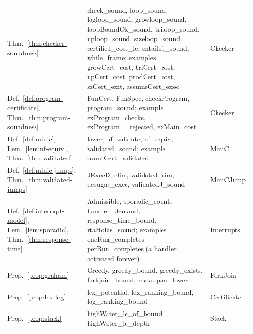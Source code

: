 \documentclass[oneside,english]{amsart}
\numberwithin{equation}{section}
\numberwithin{figure}{section}
\theoremstyle{plain}
\theoremstyle{definition}
\theoremstyle{plain}
\theoremstyle{remark}
\theoremstyle{plain}
\theoremstyle{definition}
\theoremstyle{plain}
\theoremstyle{remark}
\newcommand{\lean}[1]{{\ttfamily\small #1}}
\begin{document}
\begin{table}[p]
\begin{tabular}{@{}>{\raggedright\arraybackslash}p{}>{\raggedright\arraybackslash}p{}>{\raggedright\arraybackslash}p{}@{}}
Thm.~\ref{thm:checker-soundness} & \lean{check\_\allowbreak sound}, \lean{loop\_\allowbreak sound}, \lean{logloop\_\allowbreak sound}, \lean{growloop\_\allowbreak sound}, \lean{loopBoundOk\_\allowbreak sound}, \lean{triloop\_\allowbreak sound}, \lean{uploop\_\allowbreak sound}, \lean{sizeloop\_\allowbreak sound}, \lean{certified\_\allowbreak cost\_\allowbreak le}, \lean{entails1\_\allowbreak sound}, \lean{while\_\allowbreak frame}; examples \lean{growCert\_\allowbreak cost}, \lean{triCert\_\allowbreak cost}, \lean{upCert\_\allowbreak cost}, \lean{prodCert\_\allowbreak cost}, \lean{szCert\_\allowbreak exit}, \lean{assumeCert\_\allowbreak exec} & \lean{Checker} \\
Def.~\ref{def:program-certificate}, Thm.~\ref{thm:program-soundness} & \lean{FunCert}, \lean{FunSpec}, \lean{checkProgram}, \lean{program\_\allowbreak sound}; example \lean{exProgram\_\allowbreak checks}, \lean{exProgram\_\allowbreak 17\_\allowbreak rejected}, \lean{exMain\_\allowbreak cost} & \lean{Checker} \\
Def.~\ref{def:minic}, Lem.~\ref{lem:nf-equiv}, Thm.~\ref{thm:validated} & \lean{lower}, \lean{nf}, \lean{validate}, \lean{nf\_\allowbreak equiv}, \lean{validated\_\allowbreak sound}; example \lean{countCert\_\allowbreak validated} & \lean{MiniC} \\
Def.~\ref{def:minic-jumps}, Thm.~\ref{thm:validated-jumps} & \lean{JExecD}, \lean{elim}, \lean{validateJ}, \lean{sim}, \lean{desugar\_\allowbreak exec}, \lean{validatedJ\_\allowbreak sound} & \lean{MiniCJump} \\
Def.~\ref{def:interrupt-model}, Lem.~\ref{lem:sporadic}, Thm.~\ref{thm:response-time} & \lean{Admissible}, \lean{sporadic\_\allowbreak count}, \lean{handler\_\allowbreak demand}, \lean{response\_\allowbreak time\_\allowbreak bound}, \lean{rtaHolds\_\allowbreak sound}; examples \lean{oneRun\_\allowbreak completes}, \lean{perRun\_\allowbreak completes} (a handler activated forever) & \lean{Interrupts} \\
Prop.~\ref{prop:graham} & \lean{Greedy}, \lean{greedy\_\allowbreak bound}, \lean{greedy\_\allowbreak exists}, \lean{forkjoin\_\allowbreak bound}, \lean{makespan\_\allowbreak lower} & \lean{ForkJoin} \\
Prop.~\ref{prop:lex-log} & \lean{lex\_\allowbreak potential}, \lean{lex\_\allowbreak ranking\_\allowbreak bound}, \lean{log\_\allowbreak ranking\_\allowbreak bound} & \lean{Certificate} \\
Prop.~\ref{prop:stack} & \lean{highWater\_\allowbreak le\_\allowbreak of\_\allowbreak bound}, \lean{highWater\_\allowbreak le\_\allowbreak depth} & \lean{Stack} \\

\end{tabular}
\end{table}
\end{document}
